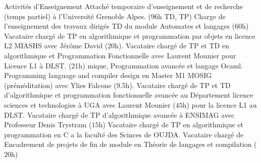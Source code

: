 

\begin{rubric}{Activités d’Enseignement}
    \entry*[$2018$ -- $2019$] Attaché temporaire d'enseignement et de recherche (temps partiel) à l'Université Grenoble Alpes. (96h TD, TP)
    \entry*[$2018$ -- $2019$] Charge de l'enseignement des travaux dirigés TD du module Automates et langages (60h) 
    \entry*[$2017$ -- $2018$] Vacataire chargé de TP en algorithmique et programmation par objets en licence L2 MIASHS avec Jérôme David (20h).
    \entry*[$2017$ -- $2018$] Vacataire chargé de TP et TD en algorithmique et Programmation Fonctionnelle avec Laurent Mounier pour Licence L1 à DLST. (21h)
mique, Programmation avancée et langage Ocaml.
    \entry*[$2017$ -- $2018$] Programming language and compiler design en Master M1 MOSIG (préméditation)  avec Ylies Falcone (9.5h).
\entry*[$2016$ -- $2017$]%
	Vacataire chargé de TP et TD d'algorithmique et programmation fonctionnelle avancée au Département licence sciences et technologies à UGA avec Laurent Mounier ($45$h) pour la licence L1 au DLST.
%
\entry*[$2016$ -- $2017$]%
	Vacataire chargé de TP d'algorithmique avancée à ENSIMAG avec Professeur Denis Trystram ($15$h)
%
\entry*[$2014$ -- $2015$] Vacataire chargé de TP en algorithmique et programmation en C a la faculté des Scinces de OUJDA.%
\entry*[$2014$ -- $2015$]
        Vacataire chargé de Encadrement de projets de fin de module en Théorie de langages et compilation ($20$h)
%
%
\end{rubric}
